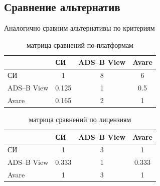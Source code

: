 \documentclass[a4paper,12pt]{report} %
\begin{document}
\subsection{Сравнение альтернатив}
Аналогично сравним альтернативы по критериям

\begin{table}[h]
  \caption{матрица сравнений по платформам}
  \begin{tabular}{l|c|c|c|}
    \cline{2-4}
    {}                               & \multicolumn{1}{l|}{СИ}        & \multicolumn{1}{l|}{ADS--B View} & \multicolumn{1}{l|}{Avare} \\ \hline
    \multicolumn{1}{|l|}{СИ}         & 1                              & 8                               & 6                          \\ \hline
    \multicolumn{1}{|l|}{ADS--B View} & 0.125                          & 1                               & 0.5                        \\ \hline
    \multicolumn{1}{|l|}{Avare}      & 0.165                          & 2                               & 1                          \\ \hline
  \end{tabular}
\end{table}

\begin{table}
  \caption{матрица сравнений по лицензиям}
  \begin{tabular}{l|c|c|c|}
    \cline{2-4}
    {}                               & \multicolumn{1}{l|}{СИ}        & \multicolumn{1}{l|}{ADS--B View} & \multicolumn{1}{l|}{Avare} \\ \hline
    \multicolumn{1}{|l|}{СИ}         & 1                              & 3                               & 1                          \\ \hline
    \multicolumn{1}{|l|}{ADS--B View} & 0.333                          & 1                               & 0.333                      \\ \hline
    \multicolumn{1}{|l|}{Avare}      & 1                              & 3                               & 1                          \\ \hline
  \end{tabular}
\end{table}
\end{document}
